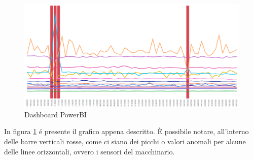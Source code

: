 \begin{figure}[t]
	\centering
	\includegraphics[width=14cm, scale=1]{images/powerbi}
	\caption{Dashboard PowerBI}
	\label{powerbi}
\end{figure}

In figura \ref{powerbi} é presente il grafico appena descritto. È possibile notare, all'interno delle barre verticali rosse, come ci siano dei picchi o valori anomali per alcune delle linee orizzontali, ovvero i sensori del macchinario. 